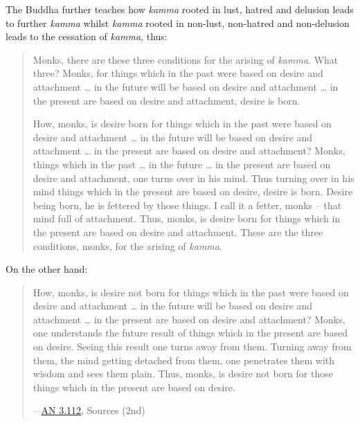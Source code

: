 The Buddha further teaches how \emph{kamma} rooted in lust, hatred and delusion leads to further \emph{kamma} whilst \emph{kamma} rooted in non-lust, non-hatred and non-delusion leads to the cessation of \emph{kamma}, thus:

\begin{quote}
Monks, there are these three conditions for the arising of \emph{kamma}. What three? Monks, for things which in the past were based on desire and attachment \ldots{} in the future will be based on desire and attachment \ldots{} in the present are based on desire and attachment, desire is born.

How, monks, is desire born for things which in the past were based on desire and attachment \ldots{} in the future will be based on desire and attachment \ldots{} in the present are based on desire and attachment? Monks, things which in the past \ldots{} in the future \ldots{} in the present are based on desire and attachment, one turns over in his mind. Thus turning over in his mind things which in the present are based on desire, desire is born. Desire being born, he is fettered by those things. I call it a fetter, monks -- that mind full of attachment. Thus, monks, is desire born for things which in the present are based on desire and attachment. These are the three conditions, monks, for the arising of \emph{kamma}.
\end{quote}

On the other hand:

\begin{quote}
How, monks, is desire not born for things which in the past were based on desire and attachment \ldots{} in the future will be based on desire and attachment \ldots{} in the present are based on desire and attachment? Monks, one understands the future result of things which in the present are based on desire. Seeing this result one turns away from them. Turning away from them, the mind getting detached from them, one penetrates them with wisdom and sees them plain. Thus, monks, is desire not born for those things which in the present are based on desire.

 -- \href{https://suttacentral.net/an3.112/en/sujato}{AN 3.112}, Sources (2nd)
\end{quote}
